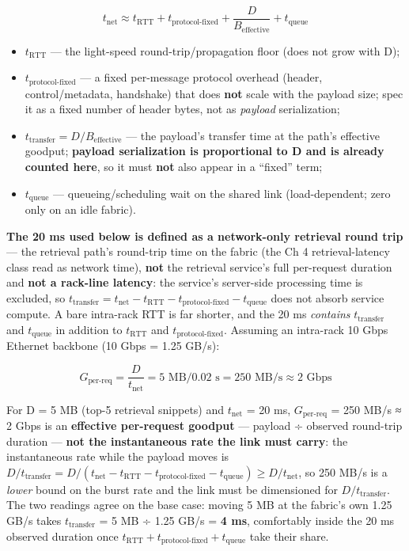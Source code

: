 \[
t_\text{net} \approx t_\text{RTT} + t_\text{protocol-fixed} + \frac{D}{B_\text{effective}} + t_\text{queue}
\]

\begin{itemize}
\tightlist
\item
  \(t_\text{RTT}\) --- the light-speed round-trip/propagation floor
  (does not grow with D);
\item
  \(t_\text{protocol-fixed}\) --- a fixed per-message protocol overhead
  (header, control/metadata, handshake) that does \textbf{not} scale
  with the payload size; spec it as a fixed number of header bytes, not
  as \emph{payload} serialization;
\item
  \(t_\text{transfer} = D / B_\text{effective}\) --- the payload's
  transfer time at the path's effective goodput; \textbf{payload
  serialization is proportional to D and is already counted here}, so it
  must \textbf{not} also appear in a ``fixed'' term;
\item
  \(t_\text{queue}\) --- queueing/scheduling wait on the shared link
  (load-dependent; zero only on an idle fabric).
\end{itemize}

\textbf{The 20 ms used below is defined as a network-only retrieval
round trip} --- the retrieval path's round-trip time on the fabric (the
Ch 4 retrieval-latency class read as network time), \textbf{not} the
retrieval service's full per-request duration and \textbf{not a
rack-line latency}: the service's server-side processing time is
excluded, so
\(t_\text{transfer} = t_\text{net} - t_\text{RTT} - t_\text{protocol-fixed} - t_\text{queue}\)
does not absorb service compute. A bare intra-rack RTT is far shorter,
and the 20 ms \emph{contains} \(t_\text{transfer}\) and
\(t_\text{queue}\) in addition to \(t_\text{RTT}\) and
\(t_\text{protocol-fixed}\). Assuming an intra-rack 10 Gbps Ethernet
backbone (10 Gbps = 1.25 GB/s):

\[
G_\text{per-req} = \frac{D}{t_\text{net}} = 5\text{ MB} / 0.02\text{ s} = 250\text{ MB/s} \approx 2\text{ Gbps}
\]

For D = 5 MB (top-5 retrieval snippets) and \(t_\text{net}\) = 20 ms,
\(G_\text{per-req}\) = 250 MB/s ≈ 2 Gbps is an \textbf{effective
per-request goodput} --- payload ÷ observed round-trip duration ---
\textbf{not the instantaneous rate the link must carry}: the
instantaneous rate while the payload moves is
\(D/t_\text{transfer} = D/(t_\text{net} - t_\text{RTT} - t_\text{protocol-fixed} - t_\text{queue}) \ge D/t_\text{net}\),
so 250 MB/s is a \emph{lower} bound on the burst rate and the link must
be dimensioned for \(D/t_\text{transfer}\). The two readings agree on
the base case: moving 5 MB at the fabric's own 1.25 GB/s takes
\(t_\text{transfer}\) = 5 MB ÷ 1.25 GB/s = \textbf{4 ms}, comfortably
inside the 20 ms observed duration once
\(t_\text{RTT} + t_\text{protocol-fixed} + t_\text{queue}\) take their
share.

